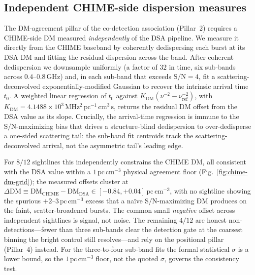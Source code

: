\subsection{Independent CHIME-side dispersion measures}
\label{sec:chime-dm}

The DM-agreement pillar of the co-detection association (Pillar~2) requires a CHIME-side DM measured
\emph{independently} of the DSA pipeline. We measure it directly from the CHIME baseband by coherently
dedispersing each burst at its DSA DM and fitting the residual dispersion across the band. After
coherent dedispersion we downsample uniformly (a factor of $32$ in time, six sub-bands across
$0.4$--$0.8\,\mathrm{GHz}$) and, in each sub-band that exceeds $\mathrm{S/N}=4$, fit a
scattering-deconvolved exponentially-modified Gaussian to recover the intrinsic arrival time $t_0$.
A weighted linear regression of $t_0$ against $K_{\mathrm{DM}}(\nu^{-2}-\nu_{\mathrm{ref}}^{-2})$,
with $K_{\mathrm{DM}}=4.1488\times10^{3}\,\mathrm{MHz^{2}\,pc^{-1}\,cm^{3}\,s}$, returns the residual
DM offset from the DSA value as its slope. Crucially, the arrival-time regression is immune to the
$\mathrm{S/N}$-maximizing bias that drives a structure-blind dedispersion to over-dedisperse a
one-sided scattering tail: the sub-band fit centroids track the scattering-deconvolved arrival, not
the asymmetric tail's leading edge.

For $8/12$ sightlines this independently constrains the CHIME DM, all consistent with the DSA value
within a $1\,\mathrm{pc\,cm^{-3}}$ physical agreement floor (Fig.~\ref{fig:chime-dm-grid}); the
measured offsets cluster at $\Delta\mathrm{DM}\equiv\mathrm{DM_{CHIME}}-\mathrm{DM_{DSA}}\in[-0.84,+0.04]\,
\mathrm{pc\,cm^{-3}}$, with no sightline showing the spurious $+2$--$3\,\mathrm{pc\,cm^{-3}}$ excess
that a na\"ive $\mathrm{S/N}$-maximizing DM produces on the faint, scatter-broadened bursts. The
common small \emph{negative} offset across independent sightlines is signal, not noise. The remaining
$4/12$ are honest non-detections---fewer than three sub-bands clear the detection gate at the coarsest
binning the bright control still resolves---and rely on the positional pillar (Pillar~4) instead. For
the three-to-four sub-band fits the formal statistical $\sigma$ is a lower bound, so the
$1\,\mathrm{pc\,cm^{-3}}$ floor, not the quoted $\sigma$, governs the consistency test.

